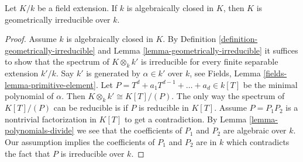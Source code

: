 \begin{lemma}
\label{lemma-field-extension-geometrically-irreducible}
Let $K/k$ be a field extension. If $k$ is algebraically closed in $K$, then
$K$ is geometrically irreducible over $k$.
\end{lemma}

\begin{proof}
Assume $k$ is algebraically closed in $K$. By
Definition \ref{definition-geometrically-irreducible}
and Lemma \ref{lemma-geometrically-irreducible} it suffices to show
that the spectrum of $K \otimes_k k'$ is irreducible for every
finite separable extension $k'/k$. Say $k'$ is generated by $\alpha \in k'$
over $k$, see
Fields, Lemma \ref{fields-lemma-primitive-element}. Let
$P = T^d + a_1 T^{d - 1} + \ldots + a_d \in k[T]$ be the minimal
polynomial of $\alpha$. Then $K \otimes_k k' \cong K[T]/(P)$.
The only way the spectrum of $K[T]/(P)$ can be reducible
is if $P$ is reducible in $K[T]$. Assume $P = P_1 P_2$ is a nontrivial
factorization in $K[T]$ to get a contradiction.
By Lemma \ref{lemma-polynomials-divide} we see that
the coefficients of $P_1$ and $P_2$ are algebraic over $k$.
Our assumption implies the coefficients of $P_1$ and $P_2$
are in $k$ which contradicts the fact that $P$ is irreducible
over $k$.
\end{proof}
